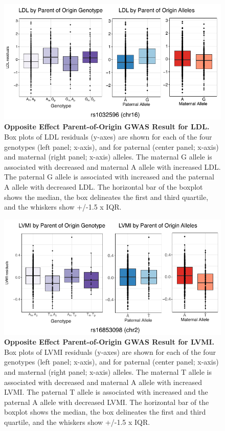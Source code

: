 \begin{figure}[!htb]
\centering
\includegraphics[width=5in]{img/ch02/fig-s8.pdf}
\caption[Opposite Effect Parent-of-Origin GWAS Result for LDL.]{\textbf{Opposite Effect Parent-of-Origin GWAS Result for LDL.}  Box plots of LDL residuals (y-axes) are shown for each of the four genotypes (left panel; x-axis), and for paternal (center panel; x-axis) and maternal (right panel; x-axis) alleles. The maternal G allele is associated with decreased and maternal A allele with increased LDL. The paternal G allele is associated with increased and the paternal A allele with decreased LDL. The horizontal bar of the boxplot shows the median, the box delineates the first and third quartile, and the whiskers show +/-1.5 x IQR.}
\label{fig:fig-s8}
\end{figure}

\begin{figure}[!htb]
\centering
\includegraphics[width=5in]{img/ch02/fig-s9.pdf}
\caption[Opposite Effect Parent-of-Origin GWAS Result for LVMI.]{\textbf{Opposite Effect Parent-of-Origin GWAS Result for LVMI.}  Box plots of LVMI residuals (y-axes) are shown for each of the four genotypes (left panel; x-axis), and for paternal (center panel; x-axis) and maternal (right panel; x-axis) alleles. The maternal T allele is associated with decreased and maternal A allele with increased LVMI. The paternal T allele is associated with increased and the paternal A allele with decreased LVMI. The horizontal bar of the boxplot shows the median, the box delineates the first and third quartile, and the whiskers show +/-1.5 x IQR.}
\label{fig:fig-s9}
\end{figure}


